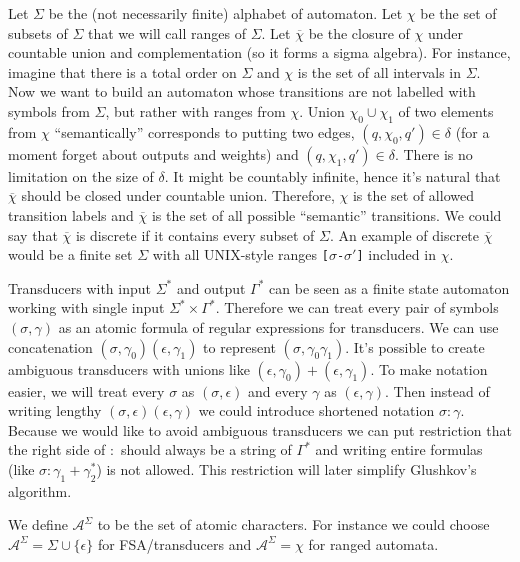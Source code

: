 Let $\Sigma$ be the (not necessarily finite) alphabet of automaton. Let $\chi$ be the set of subsets of $\Sigma$ that we will call ranges of $\Sigma$. Let  $\overline{\chi}$ be  the closure of $\chi$ under countable union and complementation (so it forms a sigma algebra). For instance, imagine that there is a total order on $\Sigma$ and  $\chi$ is the set of all intervals in $\Sigma$. Now we want to build an automaton whose transitions are not labelled with symbols from $\Sigma$, but rather with ranges from $\chi$. Union $\chi_0\cup\chi_1$ of two elements from $\chi$ ``semantically'' corresponds to putting two edges, $(q,\chi_0,q')\in\delta$ (for a moment forget about outputs and weights) and $(q,\chi_1,q')\in\delta$. There is no limitation on the size of $\delta$. It might be countably infinite, hence it's natural that $\overline{\chi}$ should be closed under countable union. Therefore, $\chi$ is the set of allowed transition labels and $\overline{\chi}$ is the set of all possible ``semantic'' transitions. We could say that $\overline{\chi}$ is discrete if it contains every subset of $\Sigma$. An example of discrete $\overline{\chi}$ would be a finite set $\Sigma$ with all UNIX-style ranges \texttt{[$\sigma$-$\sigma'$]} included in $\chi$. 

Transducers with input $\Sigma^*$ and output $\Gamma^*$ can be seen as a finite state automaton working with single input $\Sigma^* \times \Gamma^*$. Therefore we can treat every pair of symbols $(\sigma,\gamma)$ as an atomic formula of regular expressions for transducers. We can use concatenation $(\sigma,\gamma_0)(\epsilon,\gamma_1)$ to represent $(\sigma,\gamma_0\gamma_1)$. It's possible to create ambiguous transducers with unions like  $(\epsilon,\gamma_0)+(\epsilon,\gamma_1)$.  To make notation easier, we will treat every $\sigma$ as $(\sigma,\epsilon)$ and every $\gamma$ as $(\epsilon,\gamma)$. Then instead of writing lengthy $(\sigma,\epsilon)(\epsilon,\gamma)$ we could introduce shortened notation $\sigma:\gamma$. Because we would like to avoid ambiguous transducers we can put restriction that the right side of $:$ should always be a string of $\Gamma^*$ and writing entire formulas (like $\sigma:\gamma_1+\gamma_2^*$) is not allowed. This restriction will later simplify Glushkov's algorithm. 

We define $\mathcal{A}^\Sigma$ to be the set of atomic characters. For instance we could choose $\mathcal{A}^\Sigma=\Sigma\cup\{\epsilon\}$ for FSA/transducers and $\mathcal{A}^\Sigma=\chi$ for ranged automata. 

